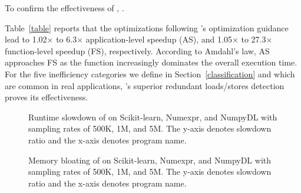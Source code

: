 To confirm the effectiveness of \tool, . 
\fi


Table~\ref{table} reports that the optimizations following \tool's optimization guidance lead to 1.02$\times$ to 6.3$\times$ application-level speedup (AS), and 1.05$\times$ to 27.3$\times$ function-level speedup (FS), respectively. According to Amdahl's law, AS approaches FS as the function increasingly dominates the overall execution time.  
For the five inefficiency categories we define in Section~\ref{classification} and which are common in real applications, \tool's superior redundant loads/stores detection proves its effectiveness.








\begin{figure*}[!t]
  \centering
  \caption{Runtime slowdown of \tool on Scikit-learn, Numexpr, and NumpyDL with sampling rates of 500K, 1M, and 5M. The y-axis denotes slowdown ratio and the x-axis denotes program name.}
  \label{fig:slowdown}
\end{figure*}


\begin{figure*}[!t]
  \centering
  \caption{Memory bloating of \tool on Scikit-learn, Numexpr, and NumpyDL with sampling rates of 500K, 1M, and 5M. The y-axis denotes slowdown ratio and the x-axis denotes program name.}
  \label{fig:memory}
\end{figure*}




